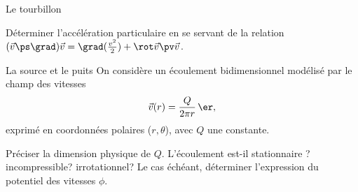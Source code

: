 \begin{exo}[PC][1][TD]{Le tourbillon}
\begin{quest}
{%
}
\item Déterminer l'accélération particulaire en se servant de la relation $(\Vec{v}\ps\grad) \Vec{v} = \grad(\frac{v^2}{2}) + \rot \Vec{v} \pv \Vec{v}$. 
\end{quest}
\end{exo}



\begin{exo}[PC][1][TD]{La source et le puits}
On considère un écoulement bidimensionnel modélisé par le champ des vitesses
\begin{equation}
\Vec{v}(r) = \frac{Q}{2\pi r}\,\er,
\end{equation}
exprimé en coordonnées polaires ($r,\theta$), avec $Q$ une constante.
\begin{quest}
\item Préciser la dimension physique de $Q$. L'écoulement est-il stationnaire ? incompressible? irrotationnel? Le cas échéant, déterminer l’expression du potentiel des vitesses $\phi$.
\end{quest}
\end{exo}
